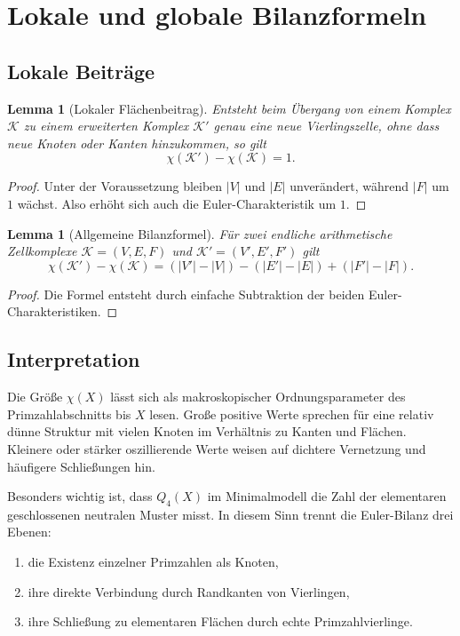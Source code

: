 \documentclass[11pt,a4paper]{article}
\newtheorem{lemma}[theorem]{Lemma}
\theoremstyle{definition}
\theoremstyle{remark}
\newcommand{\ChiX}{\chi(X)}
\begin{document}
	\section{Lokale und globale Bilanzformeln}
	
	\subsection{Lokale Beiträge}
	
	\begin{lemma}[Lokaler Flächenbeitrag]
		Entsteht beim Übergang von einem Komplex $\mathcal K$ zu einem erweiterten Komplex $\mathcal K'$ genau eine neue Vierlingszelle, ohne dass neue Knoten oder Kanten hinzukommen, so gilt
		\[
		\chi(\mathcal K')-\chi(\mathcal K)=1.
		\]
	\end{lemma}
	
	\begin{proof}
		Unter der Voraussetzung bleiben $|V|$ und $|E|$ unverändert, während $|F|$ um $1$ wächst. Also erhöht sich auch die Euler-Charakteristik um $1$.
	\end{proof}
	
	\begin{lemma}[Allgemeine Bilanzformel]
		Für zwei endliche arithmetische Zellkomplexe $\mathcal K=(V,E,F)$ und $\mathcal K'=(V',E',F')$ gilt
		\[
		\chi(\mathcal K')-\chi(\mathcal K)=(|V'|-|V|)-(|E'|-|E|)+(|F'|-|F|).
		\]
	\end{lemma}
	
	\begin{proof}
		Die Formel entsteht durch einfache Subtraktion der beiden Euler-Charakteristiken.
	\end{proof}
	
	\subsection{Interpretation}
	
	Die Größe $\ChiX$ lässt sich als makroskopischer Ordnungsparameter des Primzahlabschnitts bis $X$ lesen. Große positive Werte sprechen für eine relativ dünne Struktur mit vielen Knoten im Verhältnis zu Kanten und Flächen. Kleinere oder stärker oszillierende Werte weisen auf dichtere Vernetzung und häufigere Schließungen hin.
	
	Besonders wichtig ist, dass $Q_4(X)$ im Minimalmodell die Zahl der elementaren geschlossenen neutralen Muster misst. In diesem Sinn trennt die Euler-Bilanz drei Ebenen:
	\begin{enumerate}[label=(\arabic*),itemsep=0.2em]
		\item die Existenz einzelner Primzahlen als Knoten,
		\item ihre direkte Verbindung durch Randkanten von Vierlingen,
		\item ihre Schließung zu elementaren Flächen durch echte Primzahlvierlinge.
	\end{enumerate}
	
\end{document}

